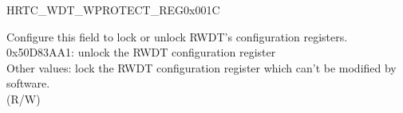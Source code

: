 \begin{register}{H}{RTC\_WDT\_WPROTECT\_REG}{0x001C}\label{regdesc:RTCWDTWPROTECTREG}
%
\regnewline%
\begin{regdesc}\begin{reglist}
\label{fielddesc:RTCWDTWKEY}\item [RTC\_WDT\_WKEY] Configure this field to lock or unlock RWDT's configuration registers.\\
0x50D83AA1: unlock the RWDT configuration register \\
Other values: lock the RWDT configuration register which can't be modified by software.\\
 (R/W)
\end{reglist}\end{regdesc}
\end{register}


